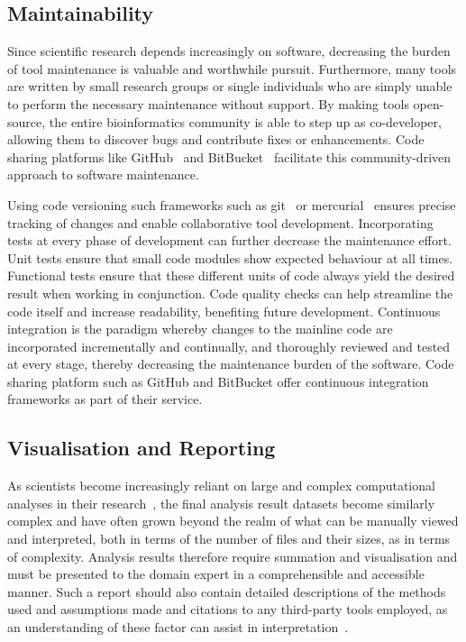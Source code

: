 \begin{justify}
\subsection{Maintainability}
Since scientific research depends increasingly on software, decreasing the burden of tool maintenance is valuable and worthwhile pursuit. Furthermore, many tools are written by small research groups or single individuals who are simply unable to perform the necessary maintenance without support. By making tools open-source, the entire bioinformatics community is able to step up as co-developer, allowing them to discover bugs and contribute fixes or enhancements. Code sharing platforms like GitHub~\cite{url-github} and BitBucket~\cite{url-bitbucket} facilitate this community-driven approach to software maintenance.

Using code versioning such frameworks such as git~\cite{url-git} or mercurial~\cite{url-mercurial} ensures precise tracking of changes and enable collaborative tool development. Incorporating tests at every phase of development can further decrease the maintenance effort. Unit tests ensure that small code modules show expected behaviour at all times. Functional tests ensure that these different units of code always yield the desired result when working in conjunction. Code quality checks can help streamline the code itself and increase readability, benefiting future development. Continuous integration is the paradigm whereby changes to the mainline code are incorporated incrementally and continually, and thoroughly reviewed and tested at every stage, thereby decreasing the maintenance burden of the software. Code sharing platform such as GitHub and BitBucket offer continuous integration frameworks as part of their service.

\subsection{Visualisation and Reporting}

As scientists become increasingly reliant on large and complex computational analyses in their research~\cite{chen2014big}, the final analysis result datasets become similarly complex and have often grown beyond the realm of what can be manually viewed and interpreted, both in terms of the number of files and their sizes, as in terms of complexity. Analysis results therefore require summation and visualisation and must be presented to the domain expert in a comprehensible and accessible manner. Such a report should also contain detailed descriptions of the methods used and assumptions made and citations to any third-party tools employed, as an understanding of these factor can assist in interpretation~\cite{kumar2007bioinformatics}.


\end{justify}
